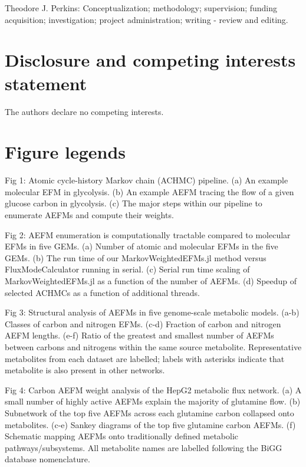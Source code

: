 \documentclass[12pt]{article}
\begin{document}
\noindent Theodore J. Perkins: Conceptualization; methodology;
supervision; funding acquisition; investigation; project administration;
writing - review and editing.

\section*{Disclosure and competing interests statement}

The authors declare no competing interests.



\section*{Figure legends}

\noindent Fig 1: Atomic cycle-history Markov chain (ACHMC) pipeline. (a) An
example molecular EFM in glycolysis. (b) An example AEFM tracing the flow
of a given glucose carbon in glycolysis. (c) The major steps within our
pipeline to enumerate AEFMs and compute their weights.

\noindent Fig 2: AEFM enumeration is computationally tractable
compared to molecular EFMs in five GEMs. (a) Number of atomic and
molecular EFMs in the five GEMs. (b) The run time of our
MarkovWeightedEFMs.jl method versus FluxModeCalculator running in serial.
(c) Serial run time scaling of MarkovWeightedEFMs.jl as a function of the
number of AEFMs. (d) Speedup of selected ACHMCs as a function of
additional threads.

\noindent Fig 3: Structural analysis of AEFMs in five genome-scale
metabolic models. (a-b) Classes of carbon and nitrogen EFMs. (c-d)
Fraction of carbon and nitrogen AEFM lengths. (e-f) Ratio of the greatest
and smallest number of AEFMs between carbons and nitrogens within the same
source metabolite. Representative metabolites from each dataset are
labelled; labels with asterisks indicate that metabolite is also present
in other networks.

\noindent Fig 4: Carbon AEFM weight analysis of the HepG2 metabolic
flux network. (a) A small number of highly active AEFMs explain the
majority of glutamine flow. (b) Subnetwork of the top five AEFMs across
each glutamine carbon collapsed onto metabolites. (c-e) Sankey diagrams of
the top five glutamine carbon AEFMs. (f) Schematic mapping AEFMs onto
traditionally defined metabolic pathways/subsystems. All metabolite names are
labelled following the BiGG database nomenclature.
\end{document}
